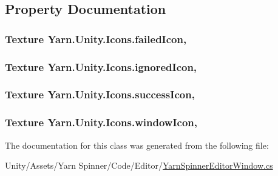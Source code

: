 \subsection{Property Documentation}
\hypertarget{a00056_aae7cc0e5016db04a90b2aa0e80957626}{
\subsubsection[{failed\-Icon}]{\setlength{\rightskip}{0pt plus 5cm}Texture Yarn.\-Unity.\-Icons.\-failed\-Icon\hspace{0.3cm}{\ttfamily [static]}, {\ttfamily [get]}}}\label{a00056_aae7cc0e5016db04a90b2aa0e80957626}
\hypertarget{a00056_a3f03f2f0fa137e349853d755e79f2e4a}{
\subsubsection[{ignored\-Icon}]{\setlength{\rightskip}{0pt plus 5cm}Texture Yarn.\-Unity.\-Icons.\-ignored\-Icon\hspace{0.3cm}{\ttfamily [static]}, {\ttfamily [get]}}}\label{a00056_a3f03f2f0fa137e349853d755e79f2e4a}
\hypertarget{a00056_aec8aea03eb6e31771ebc98e0611fff79}{
\subsubsection[{success\-Icon}]{\setlength{\rightskip}{0pt plus 5cm}Texture Yarn.\-Unity.\-Icons.\-success\-Icon\hspace{0.3cm}{\ttfamily [static]}, {\ttfamily [get]}}}\label{a00056_aec8aea03eb6e31771ebc98e0611fff79}
\hypertarget{a00056_aa78ab016ad041bc36850c8b20ba63972}{
\subsubsection[{window\-Icon}]{\setlength{\rightskip}{0pt plus 5cm}Texture Yarn.\-Unity.\-Icons.\-window\-Icon\hspace{0.3cm}{\ttfamily [static]}, {\ttfamily [get]}}}\label{a00056_aa78ab016ad041bc36850c8b20ba63972}


The documentation for this class was generated from the following file\-:\begin{DoxyCompactItemize}
\item 
Unity/\-Assets/\-Yarn Spinner/\-Code/\-Editor/\hyperlink{a00127}{Yarn\-Spinner\-Editor\-Window.\-cs}\end{DoxyCompactItemize}
